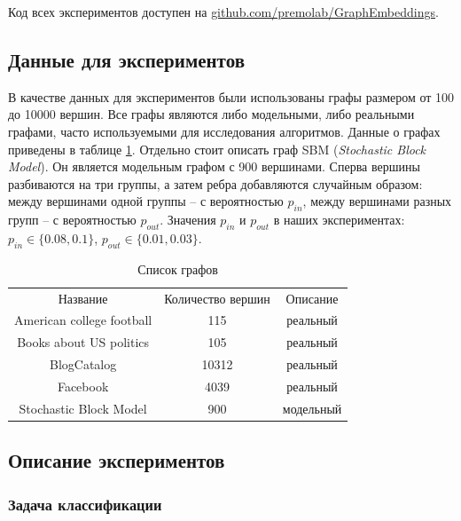 \documentclass[12pt,a4paper]{extarticle}
\begin{document}
    Код всех экспериментов доступен на \url{github.com/premolab/GraphEmbeddings}.
    
    \subsection{Данные для экспериментов}
    
    В качестве данных для экспериментов были использованы графы размером от 100 до 10000 вершин.
    Все графы являются либо модельными, либо реальными графами, часто используемыми для исследования алгоритмов. Данные о графах приведены в таблице \ref{table_graphs}.
    Отдельно стоит описать граф SBM (\textit{Stochastic Block Model}). Он является модельным графом с 900 вершинами. Сперва вершины разбиваются на три группы, а затем ребра добавляются случайным образом: между вершинами одной группы -- с вероятностью $p_{in}$, между вершинами разных групп -- с вероятностью $p_{out}$. Значения $p_{in}$ и $p_{out}$ в наших экспериментах: $p_{in} \in \{0.08, 0.1\}$, $p_{out} \in \{0.01, 0.03\}$.
    
    \begin{table}
    \begin{center}
    \begin{tabular}{ccc}
    	Название & Количество вершин & Описание\\
        \noalign{\smallskip}
        \hline
        \noalign{\smallskip}
        American college football & 115 & реальный \\
        Books about US politics & 105 & реальный \\
        BlogCatalog & 10312 & реальный \\
        Facebook & 4039 & реальный \\
        Stochastic Block Model & 900 & модельный
    \end{tabular}
    \end{center}
    \caption{Список графов} \label{table_graphs}
    \end{table}
    
    \subsection{Описание экспериментов}
    
    \subsubsection{Задача классификации}
    
\end{document}
